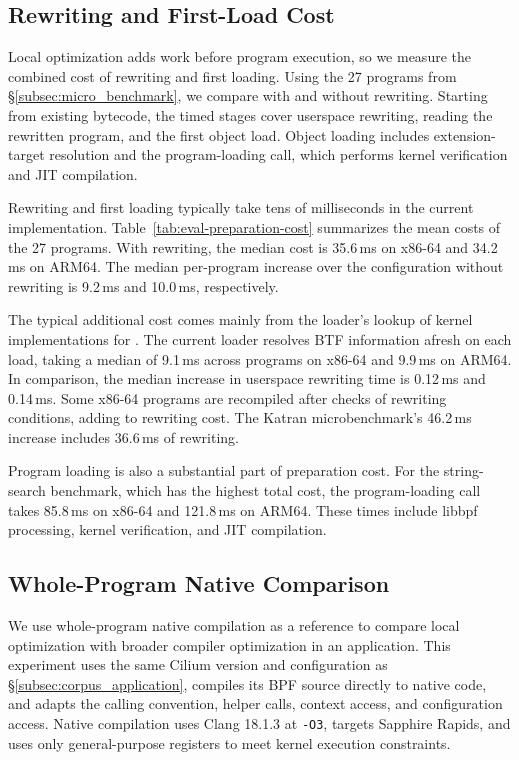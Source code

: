 \subsection{Rewriting and First-Load Cost}
\label{subsec:preparation-cost}



Local optimization adds work before program execution, so we measure the combined cost of rewriting and first loading. Using the 27 programs from \S\ref{subsec:micro_benchmark}, we compare \tool with and without \kinsn rewriting. Starting from existing bytecode, the timed stages cover userspace rewriting, reading the rewritten program, and the first object load. Object loading includes extension-target resolution and the program-loading call, which performs kernel verification and JIT compilation.

Rewriting and first loading typically take tens of milliseconds in the current implementation. Table~\ref{tab:eval-preparation-cost} summarizes the mean costs of the 27 programs. With \kinsn rewriting, the median cost is 35.6\,ms on x86-64 and 34.2\,ms on ARM64. The median per-program increase over the configuration without \kinsn rewriting is 9.2\,ms and 10.0\,ms, respectively.

The typical additional cost comes mainly from the loader's lookup of kernel implementations for \kinsns. The current loader resolves BTF information afresh on each load, taking a median of 9.1\,ms across programs on x86-64 and 9.9\,ms on ARM64. In comparison, the median increase in userspace rewriting time is 0.12\,ms and 0.14\,ms. Some x86-64 programs are recompiled after checks of rewriting conditions, adding to rewriting cost. The Katran microbenchmark's 46.2\,ms increase includes 36.6\,ms of rewriting.

Program loading is also a substantial part of preparation cost. For the string-search benchmark, which has the highest total cost, the program-loading call takes 85.8\,ms on x86-64 and 121.8\,ms on ARM64. These times include libbpf processing, kernel verification, and JIT compilation.

\subsection{Whole-Program Native Comparison}
\label{subsec:native-comparison}




We use whole-program native compilation as a reference to compare local optimization with broader compiler optimization in an application. This experiment uses the same Cilium version and configuration as \S\ref{subsec:corpus_application}, compiles its BPF source directly to native code, and adapts the calling convention, helper calls, context access, and configuration access. Native compilation uses Clang 18.1.3 at \texttt{-O3}, targets Sapphire Rapids, and uses only general-purpose registers to meet kernel execution constraints.

